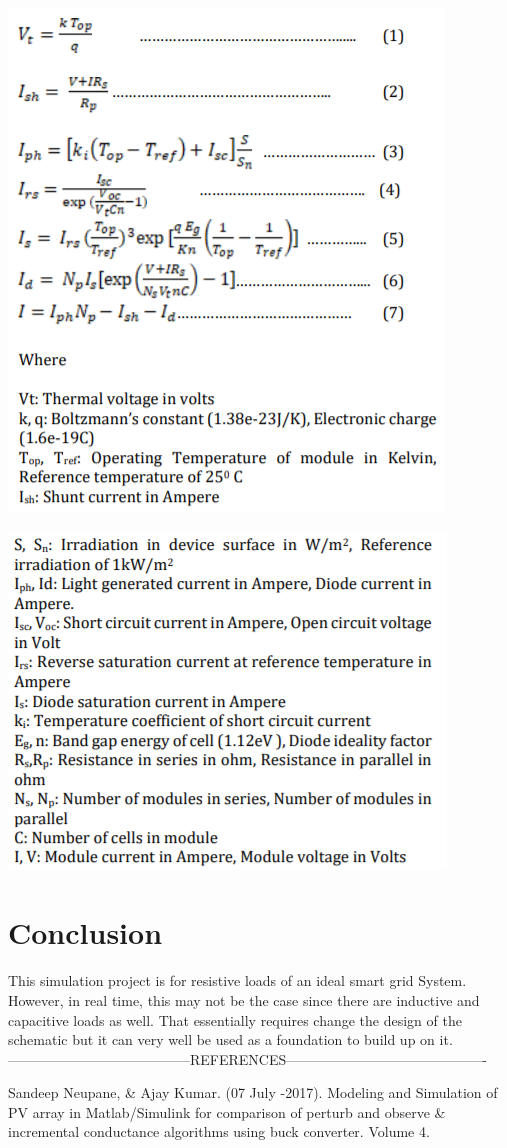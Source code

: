 \documentclass[12pt]{report}
\begin{document}
\begin{center}
\includegraphics[scale=0.8]{pics/2.PNG}
\end{center}
\begin{center}
\includegraphics[scale=0.8]{pics/3.PNG}
\end{center}

\section*{Conclusion}

This simulation project is for resistive loads of an ideal smart grid System. However, in real time,  this may not be the case since there are inductive and capacitive loads as well. That essentially requires change the design of the schematic but it can very well be used as a foundation to build up on it.\\


---------------------------------------REFERENCES-------------------------------------------

Sandeep Neupane, \& Ajay Kumar. (07 July -2017). Modeling and Simulation of PV array in Matlab/Simulink for comparison of perturb and observe \& incremental conductance algorithms using buck converter. Volume 4.
\end{document}

